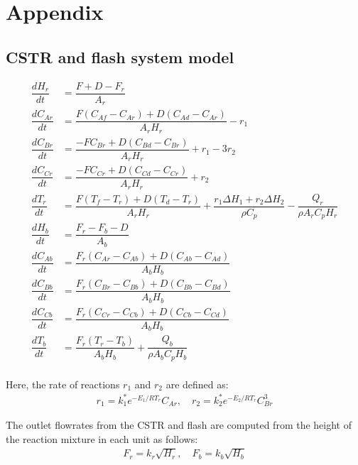 \documentclass[10pt]{article}
\begin{document}
\section*{Appendix} 
\renewcommand{\thesubsection}{\Alph{subsection}}

\subsection{CSTR and flash system model} \label{app:cstr_flash}

\begin{align*}
  \dfrac{dH_r}{dt} &= \dfrac{F + D -F_r}{A_r}\\
  \dfrac{dC_{Ar}}{dt} &= \dfrac{F(C_{Af} -C_{Ar}) +
                         D(C_{Ad} -C_{Ar})}{A_rH_r} - r_1 \\
  \dfrac{dC_{Br}}{dt} &= \dfrac{-FC_{Br} + 
                          D(C_{Bd} -C_{Br})}{A_rH_r} + r_1 -3r_2\\
  \dfrac{dC_{Cr}}{dt} &= \dfrac{-FC_{Cr} + 
  D(C_{Cd} -C_{Cr})}{A_rH_r} + r_2\\
  \dfrac{dT_r}{dt} &= \dfrac{F(T_f - T_r) + D(T_d -T_r)}{A_rH_r} + 
                      \dfrac{r_1\Delta H_1 + r_2\Delta H_2}{\rho C_p} - 
                      \dfrac{Q_r}{\rho A_r C_p H_r}\\
  \dfrac{dH_b}{dt} &= \dfrac{F_r - F_b - D}{A_b} \\
  \dfrac{dC_{Ab}}{dt} &= \dfrac{F_r(C_{Ar} -C_{Ab}) + 
                          D(C_{Ab} -C_{Ad})}{A_bH_b} \\
  \dfrac{dC_{Bb}}{dt} &= \dfrac{F_r(C_{Br} -C_{Bb}) + 
                          D(C_{Bb} -C_{Bd})}{A_bH_b} \\
  \dfrac{dC_{Cb}}{dt} &= \dfrac{F_r(C_{Cr} -C_{Cb}) + 
                          D(C_{Cb} -C_{Cd})}{A_bH_b} \\
  \dfrac{dT_b}{dt} &= \dfrac{F_r(T_r - T_b)}{A_bH_b} +
                      \dfrac{Q_b}{\rho A_b C_p H_b}\\
\end{align*}

Here, the rate of reactions $r_1$ and $r_2$ are defined as:
\begin{align*}
  r_1 = k_1^*e^{-E_1/RT_r}C_{Ar}, \quad r_2 = k_2^*e^{-E_2/RT_r}C_{Br}^3
\end{align*}

The outlet flowrates from the CSTR and flash are computed from the height of the reaction mixture in each unit as follows:
\begin{align*}
  F_r = k_r\sqrt{H_r}, \quad F_b = k_b\sqrt{H_b}
\end{align*}
\end{document}

